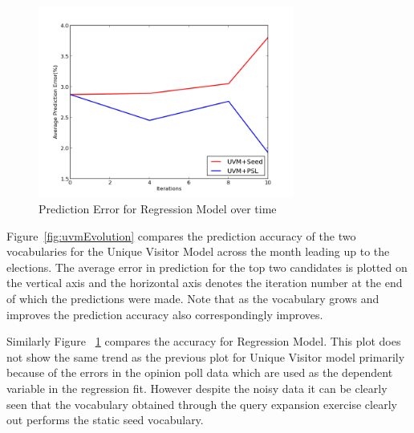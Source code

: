 \begin{figure}
	\centering
	\includegraphics[width=0.75\textwidth, height=0.3\textheight]{support_files/RMevolution.png}
	\caption{Prediction Error for Regression Model over time}
	\label{fig:rmEvolution}
\end{figure}
Figure~\ref{fig:uvmEvolution} compares the prediction accuracy of the two vocabularies for the Unique Visitor Model across the month leading up to the elections. 
The average error in prediction for the top two candidates is plotted on the vertical axis and the horizontal axis denotes the iteration number at the end of which the predictions were made.
Note that as the vocabulary grows and improves the prediction accuracy also correspondingly improves.

Similarly Figure ~\ref{fig:rmEvolution} compares the accuracy for Regression Model. 
This plot does not show the same trend as the previous plot for Unique Visitor model primarily because of the errors in the opinion poll data which are used as the dependent variable in the regression fit. 
However despite the noisy data it can be clearly seen that the vocabulary obtained through the query expansion exercise clearly out performs the static seed vocabulary.
